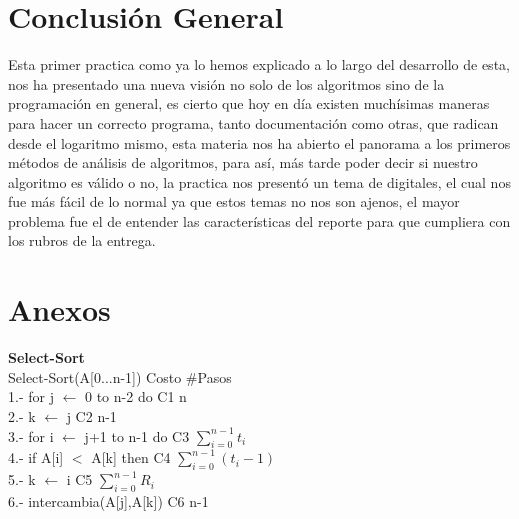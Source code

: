 \documentclass[spanish]{article}
\begin{document}
	\section{Conclusi\'on General}
	Esta primer practica como ya lo hemos explicado a lo largo del desarrollo de esta, nos ha presentado una nueva visión no solo de 	los algoritmos sino de la programación en general, es cierto que hoy en día existen muchísimas maneras para hacer un correcto programa, tanto documentación como otras, que radican desde el logaritmo mismo, esta materia nos ha abierto el panorama a los primeros métodos de análisis de algoritmos, para así, más tarde poder decir si nuestro algoritmo es válido o no, la practica nos presentó un tema de digitales, el cual nos fue más fácil de lo normal ya que estos temas no nos son ajenos,  el mayor problema fue el de entender las características del reporte para que cumpliera con los rubros de la entrega.
	\newpage
	\section{Anexos}
	
	{\Large{\bf Select-Sort}}\\
	Select-Sort(A[0...n-1]) \hspace{2.9cm}Costo \hspace{1.7cm} \#Pasos \\
	1.-	\hspace{0.7cm}for j $\leftarrow$ 0 to n-2 do \hspace{2.3cm} C1 \hspace{2.0cm} n\\
	2.-		\hspace{1.4cm}k $\leftarrow$ j\hspace{3.8cm} C2 \hspace{2.0cm} n-1\\
	3.-		\hspace{1.4cm}for i $\leftarrow$ j+1 to n-1 do \hspace{1.3cm} C3 \hspace{2.0cm}$\sum_{i=0}^{n-1}t_{i}$\\
	4.-			\hspace{2.1cm}if A[i] $<$ A[k] then \hspace{1.1cm} C4 \hspace{2.0cm}$\sum_{i=0}^{n-1}(t_{i}-1)$\\
	5.-				\hspace{2.8cm}k $\leftarrow$ i \hspace{2.4cm} C5 \hspace{2.0cm}$\sum_{i=0}^{n-1}R_{i}$\\
	6.-	\hspace{1.4cm} intercambia(A[j],A[k]) \hspace{1.2cm} C6 \hspace{2.0cm}n-1\\
	\bigskip
	
\end{document}
